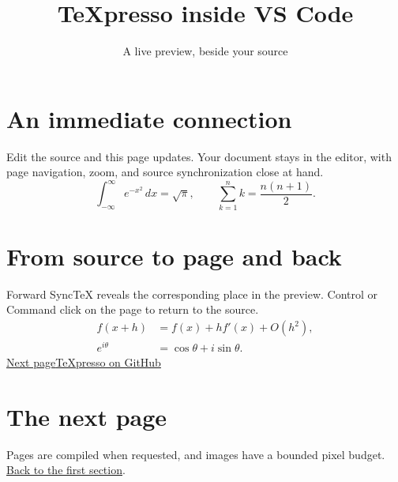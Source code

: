 \documentclass{article}
\title{TeXpresso inside VS Code}
\author{A live preview, beside your source}
\date{}
\begin{document}
\maketitle
{}
\section{An immediate connection}
Edit the source and this page updates. Your document stays in the editor,
with page navigation, zoom, and source synchronization close at hand.
\[
  \int_{-\infty}^{\infty} e^{-x^2}\,dx = \sqrt{\pi},
  \qquad \sum_{k=1}^{n} k = \frac{n(n+1)}{2}.
\]
\section{From source to page and back}
Forward SyncTeX reveals the corresponding place in the preview.
Control or Command click on the page to return to the source.
\begin{align*}
  f(x+h) &= f(x) + h f'(x) + O(h^2),\\
  e^{i\theta} &= \cos\theta + i\sin\theta.
\end{align*}
\hyperlink{section.3}{Next page}\quad\href{https://github.com/let-def/texpresso}{TeXpresso on GitHub}
\newpage
{}
\section{The next page}
Pages are compiled when requested, and images have a bounded pixel budget.
\hyperlink{section.1}{Back to the first section}.
\end{document}
